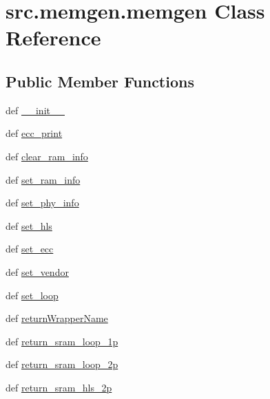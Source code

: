 \hypertarget{classsrc_1_1memgen_1_1memgen}{\section{src.\-memgen.\-memgen Class Reference}
\label{classsrc_1_1memgen_1_1memgen}
}
\subsection*{Public Member Functions}
\begin{DoxyCompactItemize}
\item 
def \hyperlink{classsrc_1_1memgen_1_1memgen_a7de963343399c0a1da1cc0289f647616}{\-\_\-\-\_\-init\-\_\-\-\_\-}
\item 
def \hyperlink{classsrc_1_1memgen_1_1memgen_aa4a6fef91792ea2e69afe31f45d4ce56}{ecc\-\_\-print}
\item 
def \hyperlink{classsrc_1_1memgen_1_1memgen_a4a06eabd91deb240804cf489adfef402}{clear\-\_\-ram\-\_\-info}
\item 
def \hyperlink{classsrc_1_1memgen_1_1memgen_a3bd23b70912a87590aa3d9b2e788b454}{set\-\_\-ram\-\_\-info}
\item 
def \hyperlink{classsrc_1_1memgen_1_1memgen_a95874f3bac553f3962d6694167af1c2b}{set\-\_\-phy\-\_\-info}
\item 
def \hyperlink{classsrc_1_1memgen_1_1memgen_a5434e927cb6ffcee455f4e6f2b6aee80}{set\-\_\-hls}
\item 
def \hyperlink{classsrc_1_1memgen_1_1memgen_a5b0f6e19af17c1fef0fdbc80b42780d6}{set\-\_\-ecc}
\item 
def \hyperlink{classsrc_1_1memgen_1_1memgen_a0e317dd8bee490fa2825c529059981ce}{set\-\_\-vendor}
\item 
def \hyperlink{classsrc_1_1memgen_1_1memgen_ac81cebfb8db386d77f32fba4913136e0}{set\-\_\-loop}
\item 
def \hyperlink{classsrc_1_1memgen_1_1memgen_a60c412b6a298453b689fdb4ff0c0a472}{return\-Wrapper\-Name}
\item 
def \hyperlink{classsrc_1_1memgen_1_1memgen_aa784a313753daafd9746d6f755088de1}{return\-\_\-sram\-\_\-loop\-\_\-1p}
\item 
def \hyperlink{classsrc_1_1memgen_1_1memgen_a0c424c632cd5d84fba52dd21758fca6a}{return\-\_\-sram\-\_\-loop\-\_\-2p}
\item 
def \hyperlink{classsrc_1_1memgen_1_1memgen_a0155d00d4ada5fe01f7e8f202520a9af}{return\-\_\-sram\-\_\-hls\-\_\-2p}
\item 

\end{DoxyCompactItemize}
